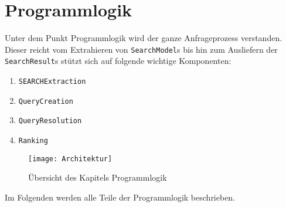 
\chapter{Programmlogik}
Unter dem Punkt Programmlogik wird der ganze Anfrageprozess verstanden. Dieser reicht vom Extrahieren von \lstinline|SearchModel|s bis hin zum Ausliefern der \lstinline|SearchResult|s stützt sich auf folgende wichtige Komponenten:

\begin{enumerate}
     \item \lstinline|SEARCHExtraction|
     \item \lstinline|QueryCreation|
     \item \lstinline|QueryResolution|
     \item \lstinline|Ranking|
\end{enumerate}

\begin{figure}[htb]
  \centering
  \texttt{[image: Architektur]}
  \caption{Übersicht des Kapitels Programmlogik}
\end{figure}

Im Folgenden werden alle Teile der Programmlogik beschrieben.





%


\pagebreak


